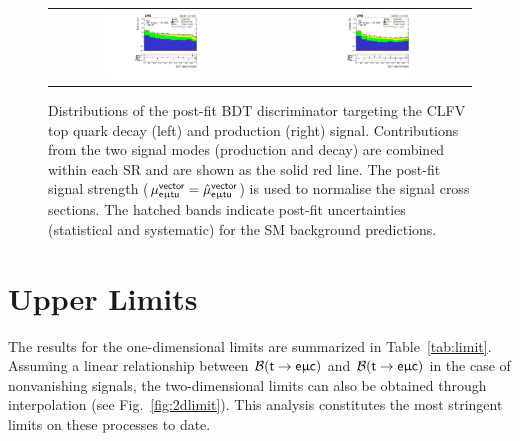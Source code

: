 \begin{figure}[tbh!]
 \begin{center}
 \begin{tabular}{cc}
  \includegraphics[width=0.48\textwidth]{figures/Part3/Results/BDT_TT_VecU}&
  \includegraphics[width=0.48\textwidth]{figures/Part3/Results/BDT_ST_VecU}\\
 \end{tabular}
 \caption{Distributions of the post-fit BDT discriminator targeting the CLFV top quark decay (left) and production (right) signal. Contributions from the two signal modes (production and decay) are combined within each SR and are shown as the solid red line. The post-fit signal strength ($\mu_{\textsf{e}\upmu\textsf{t{u}}}^{\textsf{vector}}=\hat{\mu}_{\textsf{e}\upmu\textsf{t{u}}}^{\textsf{vector}}$) is used to normalise the signal cross sections. The hatched bands indicate post-fit uncertainties (statistical and systematic) for the SM background predictions.}
 \label{fig:bdt_postfit_VecU}
 \end{center}
\end{figure} 

\section{Upper Limits}
\label{sec:Limits}

The results for the one-dimensional limits are summarized in Table~\ref{tab:limit}. Assuming a linear relationship between $\mathcal{B}(\textsf{t}\rightarrow\textsf{e}\upmu\textsf{c})$ and $\mathcal{B}(\textsf{t}\rightarrow\textsf{e}\upmu\textsf{c})$ in the case of nonvanishing signals, the two-dimensional limits can also be obtained through interpolation (see Fig.~\ref{fig:2dlimit}). This analysis constitutes the most stringent limits on these processes to date.

